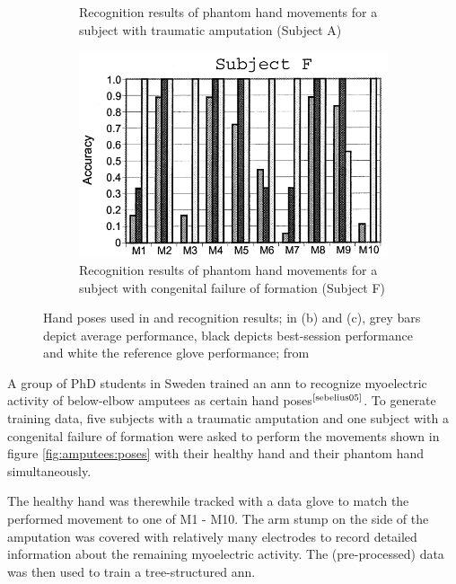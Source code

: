 \documentclass[hyperref, bachelorofscience]{cgvpub}
\newcommand{\newcite}[1]{$ ^{\text{\cite{#1}}} $}
\begin{document}
\begin{figure}
\begin{subfigure}{.3\linewidth}
		\caption{Recognition results of phantom hand movements for a subject with traumatic amputation (Subject A)}
		\label{fig:amputees:a}
	\end{subfigure}
	\hfill
	\begin{subfigure}{.3\linewidth}
		\includegraphics[width=\linewidth]{../pics/amputees_f}
		\caption{Recognition results of phantom hand movements for a subject with congenital failure of formation (Subject F)}
		\label{fig:amputees:f}
	\end{subfigure}
	\caption[Hand poses used in \cite{sebelius05} and recognition results]{Hand poses used in \cite{sebelius05} and recognition results; in (b) and (c), grey bars depict average performance, black depicts best-session performance and white the reference glove performance; from \cite{sebelius05}}
	\label{fig:amputees}
\end{figure}

A group of PhD students in Sweden trained an \acrfull{ann} to recognize myoelectric activity of below-elbow amputees as certain hand poses\newcite{sebelius05}. To generate training data, five subjects with a traumatic amputation and one subject with a congenital failure of formation were asked to perform the movements shown in figure \ref{fig:amputees:poses} with their healthy hand and their phantom hand simultaneously.

The healthy hand was therewhile tracked with a data glove to match the performed movement to one of M1 - M10. The arm stump on the side of the amputation was covered with relatively many electrodes to record detailed information about the remaining myoelectric activity. The (pre-processed) data was then used to train a tree-structured \acrshort{ann}.
\end{document}

